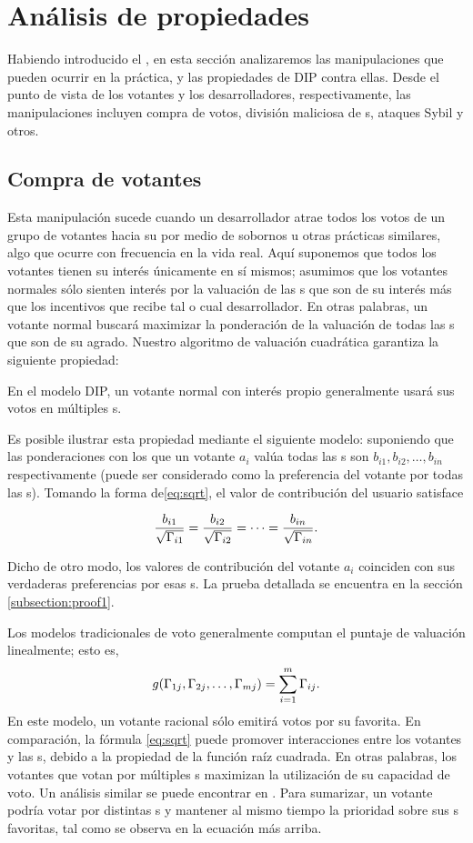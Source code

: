 \section{Análisis de propiedades}
\label{section:properties}
\noindent Habiendo introducido el \pidc, en esta sección analizaremos las manipulaciones que pueden ocurrir en la práctica, y las propiedades de DIP contra ellas\@. Desde el punto de vista de los votantes y los desarrolladores, respectivamente, las manipulaciones incluyen compra de votos, división maliciosa de {\dapp}s, ataques Sybil y otros.
\subsection{Compra de votantes}
\noindent Esta manipulación sucede cuando un desarrollador atrae todos los votos de un grupo de votantes hacia su \dapp por medio de sobornos u otras prácticas similares, algo que ocurre con frecuencia en la vida real. Aquí suponemos que todos los votantes tienen su interés únicamente en sí mismos; asumimos que los votantes normales sólo sienten interés por la valuación de las {\dapp}s que son de su interés más que los incentivos que recibe tal o cual desarrollador. En otras palabras, un votante normal buscará maximizar la ponderación de la valuación de todas las {\dapp}s que son de su agrado. Nuestro algoritmo de valuación cuadrática garantiza la siguiente propiedad:

\begin{property}
	\label{p1}
	En el modelo DIP, un votante normal con interés propio generalmente usará sus votos en múltiples {\dapp}s.
\end{property}
Es posible ilustrar esta propiedad mediante el siguiente modelo: suponiendo que las ponderaciones con los que un votante $a_i$ valúa todas las {\dapp}s son $b_{i1}, b_{i2}, \ldots, b_{in}$ respectivamente (puede ser considerado como la preferencia del votante por todas las {\dapp}s). Tomando la forma de\ref{eq:sqrt}, el valor de contribución del usuario satisface

$$\frac{b_{i1}}{\sqrt{\Gamma_{i1}}}=\frac{b_{i2}}{\sqrt{\Gamma_{i2}}}=\cdots=\frac{b_{in}}{\sqrt{\Gamma_{in}}}.$$

Dicho de otro modo, los valores de contribución del votante $a_i$ coinciden con sus verdaderas preferencias por esas {\dapp}s. La prueba detallada se encuentra en la sección \ref{subsection:proof1}.

Los modelos tradicionales de voto generalmente computan el puntaje de valuación linealmente; esto es,
$$g(\Gamma_{1j},\Gamma_{2j},\ldots,\Gamma_{mj}) = \sum_{i=1}^m \Gamma_{ij}.$$
En este modelo, un votante racional sólo emitirá votos por su \dapp favorita. En comparación, la fórmula \ref{eq:sqrt} puede promover interacciones entre los votantes y las {\dapp}s, debido a la propiedad de la función raíz cuadrada. En otras palabras, los votantes que votan por múltiples {\dapp}s maximizan la utilización de su capacidad de voto. Un análisis similar se puede encontrar en \cite{buterin2018liberal}. Para sumarizar, un votante podría votar por distintas {\dapp}s y mantener al mismo tiempo la prioridad sobre sus {\dapp}s favoritas, tal como se observa en la ecuación más arriba.

